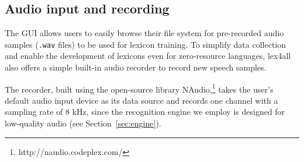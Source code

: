 \documentclass[11pt]{article}
\begin{document}
\subsection{Audio input and recording}
\label{sec:recording}


The GUI allows users to easily browse their file system for pre-recorded audio samples (\texttt{.wav} files) to be used for lexicon training. 
To simplify data collection and enable the development of lexicons even for zero-resource languages, lex4all also offers a simple built-in audio recorder to record new speech samples.

The recorder, 
built using the open-source library NAudio,\footnote{http://naudio.codeplex.com/}
takes the user's default audio input device as its data source and records one channel with a sampling rate of 8 kHz, since
the recognition engine we employ is designed for low-quality audio (see Section~\ref{sec:engine}).

\end{document}
